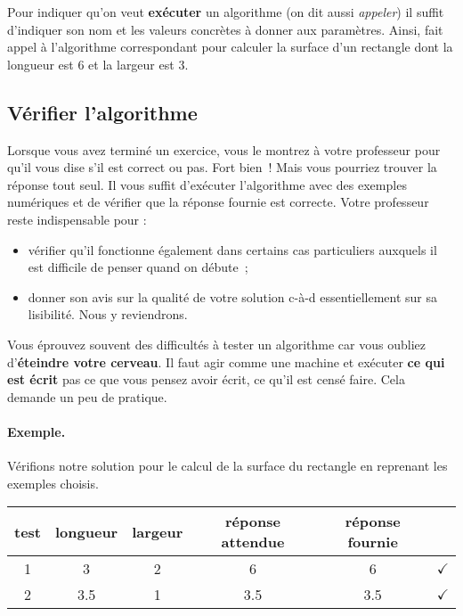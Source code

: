 			Pour indiquer qu’on veut \textbf{exécuter} un algorithme
			(on dit aussi \emph{appeler})
			il suffit d’indiquer son nom 
			et les valeurs concrètes à donner aux paramètres.
			Ainsi, 
			fait appel à l’algorithme correspondant
			pour calculer la surface d’un rectangle
			dont la longueur est $6$
			et la largeur est $3$.

		\subsection{Vérifier l’algorithme}
		
			Lorsque vous avez terminé un exercice,
			vous le montrez à votre professeur pour qu’il
			vous dise s’il est correct ou pas.
			Fort bien~!
			Mais vous pourriez trouver la réponse tout seul.
			Il vous suffit d’exécuter l’algorithme
			avec des exemples numériques et de vérifier que la réponse
			fournie est correcte.
			Votre professeur reste indispensable pour :
			\begin{itemize}
			\item
				vérifier qu’il fonctionne également
				dans certains cas particuliers
				auxquels il est difficile de penser quand on débute~;
			\item
				donner son avis sur la qualité de votre solution
				c-à-d essentiellement sur sa lisibilité.
				Nous y reviendrons.
			\end{itemize}
		
			Vous éprouvez souvent des difficultés à tester un algorithme
			car vous oubliez d’\textbf{éteindre votre cerveau}.
			Il faut agir comme une machine
			et exécuter \textbf{ce qui est écrit} 
			pas ce que vous pensez avoir écrit,
			ce qu’il est censé faire.
			Cela demande un peu de pratique.

			\paragraph{Exemple.} 
			Vérifions notre solution 
			pour le calcul de la surface du rectangle
			en reprenant les exemples choisis.
			
			\begin{center}
			\begin{tabular}{|c|cccc|c|}
			\hline
			test \no & longueur & largeur & réponse attendue & réponse fournie & {} \\\hline
			\hline 
			1 & 3   & 2 & 6   & 6   & {\color{ForestGreen}$\checkmark$} \\\hline
			2 & 3.5 & 1 & 3.5 & 3.5 & {\color{ForestGreen}$\checkmark$} \\\hline
			\end{tabular}
			\end{center}				
			
